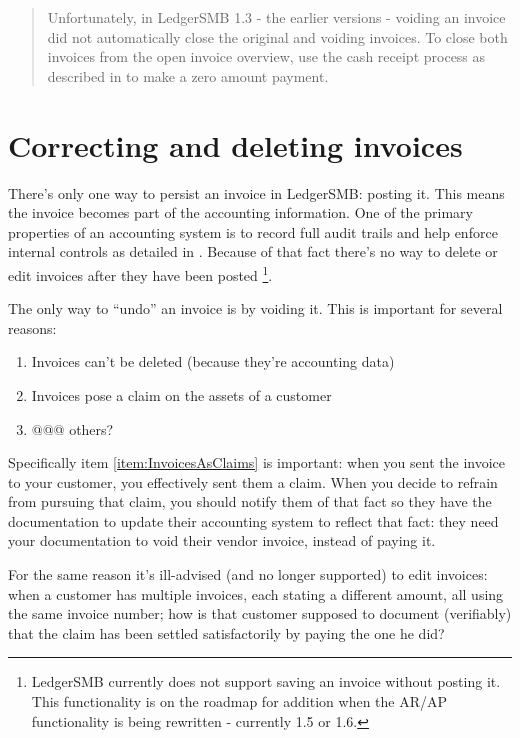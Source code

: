 \begin{quote}
Unfortunately, in LedgerSMB 1.3 - the earlier versions - voiding an invoice did not
automatically close the original and voiding invoices.  To close both invoices from
the open invoice overview, use the cash receipt process as described in
 to make a zero amount payment.
\end{quote}

\section{Correcting and deleting invoices}
\label{sec-business-processes-invoicing-correction-or-deletion}

There's only one way to persist an invoice in LedgerSMB: posting it. This means
the invoice becomes part of the accounting information. One of the primary
properties of an accounting system is to record full audit trails and help enforce
internal controls as detailed in . Because
of that fact there's no way to delete or edit invoices after they have been posted
\footnote{LedgerSMB currently does not support saving an invoice without posting
it. This functionality is on the roadmap for addition when the AR/AP functionality
is being rewritten - currently 1.5 or 1.6.}.

The only way to ``undo'' an invoice is by voiding it. This is important for several
reasons:

\begin{enumerate}
\item Invoices can't be deleted (because they're accounting data)
\item Invoices pose a claim on the assets of a \gls{customer}
\label{item:InvoicesAsClaims}
\item @@@ others?
\end{enumerate}

Specifically item \ref{item:InvoicesAsClaims} is important: when you sent the invoice
to your \gls{customer}, you effectively sent them a claim. When you decide to refrain from
pursuing that claim, you should notify them of that fact so they have the documentation
to update their accounting system to reflect that fact: they need your documentation
to void their vendor invoice, instead of paying it.

For the same reason it's ill-advised (and no longer supported) to edit invoices:
when a \gls{customer} has multiple invoices, each stating a different amount, all
using the same invoice number; how is that \gls{customer} supposed to document (verifiably)
that the claim has been settled satisfactorily by paying the one he did?

